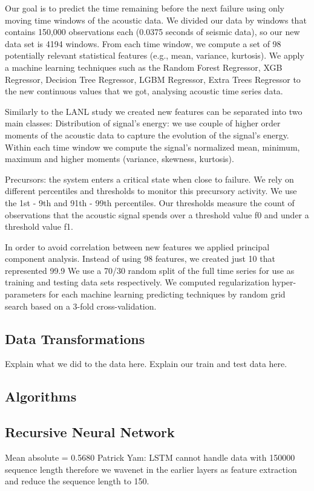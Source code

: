 \documentclass[]{llncs}
\begin{document}
Our goal is to predict the time remaining before the next failure using only moving time windows of the acoustic data. We divided our data by windows that contains 150,000 observations each (0.0375 seconds of seismic data), so our new data set is 4194 windows. From each time window, we compute a set of 98 potentially relevant statistical features (e.g., mean, variance, kurtosis). 
We apply a machine learning techniques such as the Random Forest Regressor, XGB Regressor,  Decision Tree Regressor, LGBM Regressor, Extra Trees Regressor to the new continuous values that we got, analysing acoustic time series data.\par
Similarly to the LANL study we created new features can be separated into two main classes: 
Distribution of signal’s energy: we use couple of higher order moments of the acoustic data to capture the evolution of the signal’s energy. Within each time window we compute the signal’s normalized mean, minimum, maximum and higher moments  (variance, skewness, kurtosis).\par
Precursors: the system enters a critical state when close to failure. We rely on different percentiles and thresholds to monitor this precursory activity. We use the 1st - 9th and 91th - 99th percentiles. Our thresholds measure the count of observations that the acoustic signal spends over a threshold value f0 and under a threshold value f1.

In order to avoid correlation between new features we applied principal component analysis.  Instead of using 98 features, we created just 10 that represented 99.9%
We use a 70/30 random split of the full time series for use as training and testing data sets respectively. We computed regularization hyper-parameters for each machine learning predicting techniques by random grid search based on a 3-fold cross-validation.
\subsection{Data Transformations}
Explain what we did to the data here.
Explain our train and test data here.
\subsection{Algorithms}
\subsection{Recursive Neural Network}
Mean absolute = 0.5680
Patrick Yam: LSTM cannot handle data with 150000 sequence length therefore we wavenet in the earlier layers as feature extraction and reduce the sequence length to 150.\par
\end{document}
